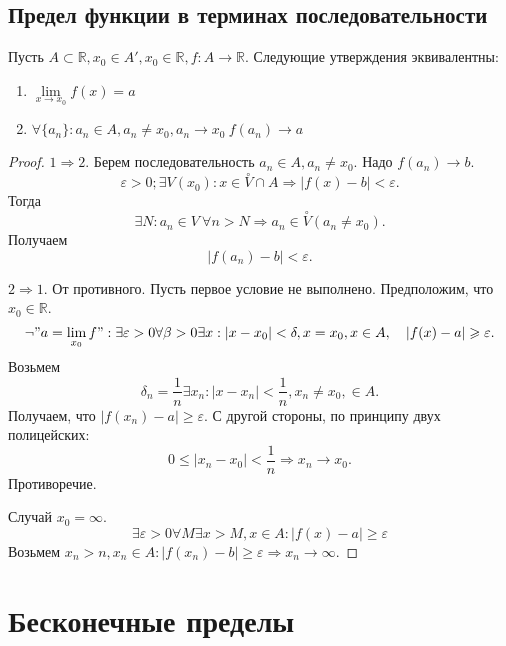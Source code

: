 \documentclass[11pt]{book}
\newcommand{\R}{\mathbb{R}}
\newcommand{\pivi}{\stackrel \circ }
\renewcommand{\le}{\leqslant}
\renewcommand{\ge}{\geqslant}
\theoremstyle{definition}
\theoremstyle{plain}
\theoremstyle{plain}
\theoremstyle{definition}
\theoremstyle{remark}
\begin{document}
\subsection{Предел функции в терминах последовательности}\label{ques_36}
\begin{thm}
Пусть $A \subset \R, x_0 \in A', x_0 \in \R, f: A \to \R$. Следующие утверждения эквивалентны:
\begin{enumerate}
\item $\lim\limits_{x \to x_0}{f(x)} = a$
\item $\forall \{a_n\}: a_n \in A, a_n \neq x_0, a_n \to x_0  ~f(a_n) \to a$
\end{enumerate}
\end{thm}
\begin{proof}
    $1 \Rightarrow 2$. 
    Берем последовательность $a_n \in  A, a_n \ne x_0$.
    Надо $f(a_n) \to  b$.
    \[
	\varepsilon >0; \exists  V(x_0): x \in  \pivi V \cap A \Rightarrow |f(x) - b| < \varepsilon 
    .\] 
    Тогда \[
	\exists N: a_n \in V ~ \forall n > N \Rightarrow a_n \in  \pivi V (a_n \ne x_0)
    .\] 
    Получаем \[
	|f(a_n) - b| < \varepsilon 
    .\] 

    $2 \Rightarrow 1$.
    От противного. Пусть первое условие не выполнено. Предположим, что $x_0 \in  \R$. \[
	\neg "a = \lim_{x_0} f": \exists \varepsilon >0 \forall \beta >0 \exists x: |x-x_0|<\delta  , x= x_0, x \in A, \quad |f(x) - a| \ge \varepsilon 
    .\] 
   Возьмем \[
     \delta  _n = \frac{1}{n} \exists x_n : |x - x_n| < \frac{1}{n}, x_n \ne x_0, \in A 
    .\] 
    Получаем, что $|f(x_n) - a| \ge  \varepsilon $. С другой стороны, по принципу двух полицейских:
    \[
	0 \le |x_n -x_0| < \frac{1}{n} \Longrightarrow x_n \to  x_0
    .\] 
    Противоречие.

    Случай $x_0 = \infty$.
    $$\exists \varepsilon >0 \forall  M \exists x > M , x \in  A: |f(x) -a| \ge  \varepsilon $$
    Возьмем $x_n > n , x_n \in A: |f(x_n) - b| \ge \varepsilon \Rightarrow x_n \to  \infty$.
\end{proof}

\section{Бесконечные пределы}
\end{document}
